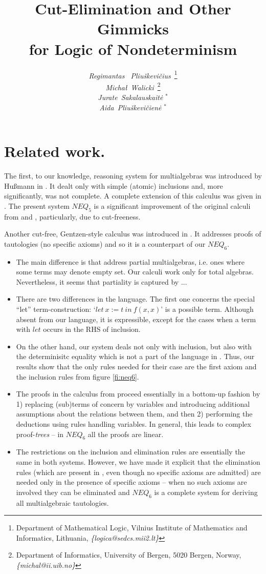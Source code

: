 \documentclass[10pt]{article}
\title{Cut-Elimination and Other Gimmicks\\ for Logic of Nondeterminism}
\author{ {\em Regimantas ~Pliu\v skevi\v cius}\ \thanks{Department of Mathematical Logic,
Vilnius Institute of Mathematics and Informatics, Lithuania,
{\sl \{logica@sedcs.mii2.lt\}}} \\
{\em Micha{\l}~Walicki}\ \thanks{Department of Informatics, University of Bergen, 5020
Bergen, Norway, {\sl \{michal@ii.uib.no\}}} \\
{\em Jurate~Sakalauskait\.e }$^*$ \\
{\em Aida~Pliu\v skevi\v cien\.e }$^*$ 
}
\begin{document}






\section{Related work.}\label{se:related}
The first, to our knowledge, reasoning system for multialgebras was introduced 
by Hu{\ss}mann in
\cite{Hus}. It dealt only with simple (atomic) inclusions and, more significantly, 
was not complete.
A complete extension of this calculus was given in \cite{Mich}.
The present system $NEQ_5$ is a significant improvement of the original
calculi from \cite{Mich} and \cite{Top}, particularly, due to cut-freeness.

Another cut-free, Gentzen-style calculus was introduced in \cite{BK95}.
It addresses proofs of tautologies (no specific axioms) and so it is a counterpart
of our $NEQ_6$.
\begin{itemize}\MyLPar
\item 
The main difference is that \cite{BK95} address partial multialgebras, i.e. ones where
some terms may denote empty set. Our calculi work only for total algebras. 
Nevertheless, it seems that partiality is captured by ...
\item
There are two differences in the language. The first one concerns
the special ``let'' term-construction: `$let\ x:=t\ in\ f(x,x)$' is a possible term. 
Although absent from our language, it is
expressible, except for the cases when a term with $let$ occurs in the RHS
of inclusion. 
\item 
On the other hand, our system
deals not only with inclusion, but also with the determinisitc equality which
is not a part of the language in \cite{BK95}.
Thus, our results show that the
only rules needed for their case are the first axiom and the inclusion rules
from figure \ref{fi:neq6}.
\item
The proofs in the calculus from \cite{BK95} proceed essentially in a bottom-up 
fashion by 1) replacing (sub)terms of concern by variables and introducing 
additional assumptions about the relations between them, and then 2) performing 
the deductions using rules handling variables. In general, this leads to complex
proof-{\em trees} -- in $NEQ_6$ all the proofs are linear.
\item
The restrictions on the inclusion and elimination rules are essentially the same
in both systems.
However, we have
made it explicit that the elimination rules (which are present in \cite{BK95}, 
even though no specific axioms are admitted)
are needed only in the presence of 
specific axioms -- when no such axioms are involved they can be eliminated and $NEQ_6$
is a complete system for deriving all multialgebraic tautologies.
\end{itemize}
\end{document}

